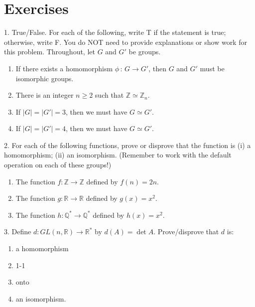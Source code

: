 \documentclass[10pt,]{book}
\theoremstyle{plain}
\theoremstyle{definition}
\theoremstyle{definition}
\theoremstyle{definition}
\theoremstyle{definition}
\numberwithin{equation}{section}
\def\Z{\mathbb{Z}}
\def\R{\mathbb{R}}
\def\Q{\mathbb{Q}}
\begin{document}
\section[{Exercises}]{Exercises}\label{exercises-4}
\begin{exerciselist}
\item[1.]\hypertarget{exercise-21}{}True/False. For each of the following, write T if the statement is true; otherwise, write F. You do NOT need to provide explanations or show work for this problem. Throughout, let \(G\) and \(G'\) be groups. \leavevmode%
\begin{enumerate}[label=(\alph*)]
\item\hypertarget{li-148}{}If there exists a homomorphism \(\phi\,:\,G\to G'\), then \(G\) and \(G'\) must be isomorphic groups.%
\item\hypertarget{li-149}{}There is an integer \(n\geq 2\) such that \(\Z\simeq \Z_n\).%
\item\hypertarget{li-150}{}If \(|G|=|G'|=3\), then we must have \(G\simeq G'\).%
\item\hypertarget{li-151}{}If \(|G|=|G'|=4\), then we must have \(G\simeq G'\).%
\end{enumerate}
%
\par\smallskip
\item[2.]\hypertarget{exercise-22}{}For each of the following functions, prove or disprove that the function is (i) a homomorphism; (ii) an isomorphism. (Remember to work with the default operation on each of these groups!) \leavevmode%
\begin{enumerate}[label=(\alph*)]
\item\hypertarget{li-156}{}The function \(f:\Z\to\Z\) defined by \(f(n)=2n\).%
\item\hypertarget{li-157}{}The function \(g:\R\to\R\) defined by \(g(x)=x^2\).%
\item\hypertarget{li-158}{}The function \(h:\Q^*\to\Q^*\) defined by \(h(x)=x^2\).%
\end{enumerate}
%
\par\smallskip
\item[3.]\hypertarget{exercise-23}{}Define \(d : GL(n,\R)\to \R^*\) by \(d(A)=\det A\). Prove/disprove that \(d\) is: \leavevmode%
\begin{enumerate}[label=(\alph*)]
\item\hypertarget{li-168}{}a homomorphism%
\item\hypertarget{li-169}{}1-1%
\item\hypertarget{li-170}{}onto%
\item\hypertarget{li-171}{}an isomorphism.%

\end{enumerate}
\end{exerciselist}
\end{document}
